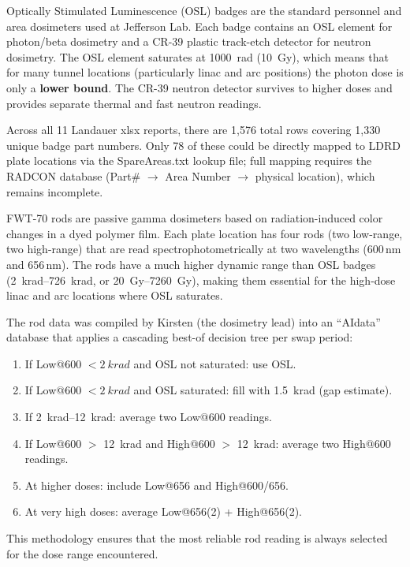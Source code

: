\documentclass[11pt,letterpaper]{article}
\newcommand{\JLab}{Jefferson Lab}
\begin{document}
\begin{description}[style=nextline]
    \item[OSL Badges (Landauer InLight 2T + CR-39)]
    Optically Stimulated Luminescence (OSL) badges are the standard personnel
    and area dosimeters used at \JLab. Each badge contains an OSL element for
    photon/beta dosimetry and a CR-39 plastic track-etch detector for neutron
    dosimetry. The OSL element saturates at \SI{1000}{rad} (\SI{10}{Gy}),
    which means that for many tunnel locations (particularly linac and arc
    positions) the photon dose is only a \textbf{lower bound}. The CR-39
    neutron detector survives to higher doses and provides separate thermal
    and fast neutron readings.

    Across all 11 Landauer xlsx reports, there are 1,576 total rows covering
    1,330 unique badge part numbers. Only 78 of these could be directly mapped
    to LDRD plate locations via the SpareAreas.txt lookup file; full mapping
    requires the RADCON database (Part\# $\to$ Area Number $\to$ physical
    location), which remains incomplete.

    \item[FWT-70 Optichromic Rods (AIdata)]
    FWT-70 rods are passive gamma dosimeters based on radiation-induced color
    changes in a dyed polymer film. Each plate location has four rods (two
    low-range, two high-range) that are read spectrophotometrically at two
    wavelengths (600\,nm and 656\,nm). The rods have a much higher dynamic
    range than OSL badges (\SIrange{2}{726}{krad}, or \SIrange{20}{7260}{Gy}),
    making them essential for the high-dose linac and arc locations where OSL
    saturates.

    The rod data was compiled by Kirsten (the dosimetry lead) into an ``AIdata''
    database that applies a cascading best-of decision tree per swap period:
    \begin{enumerate}
        \item If Low@600 $< \SI{2}{krad}$ and OSL not saturated: use OSL.
        \item If Low@600 $< \SI{2}{krad}$ and OSL saturated: fill with
        \SI{1.5}{krad} (gap estimate).
        \item If \SIrange{2}{12}{krad}: average two Low@600 readings.
        \item If Low@600 $>$ \SI{12}{krad} and High@600 $>$ \SI{12}{krad}:
        average two High@600 readings.
        \item At higher doses: include Low@656 and High@600/656.
        \item At very high doses: average Low@656(2) + High@656(2).
    \end{enumerate}
    This methodology ensures that the most reliable rod reading is always
    selected for the dose range encountered.


\end{description}
\end{document}
